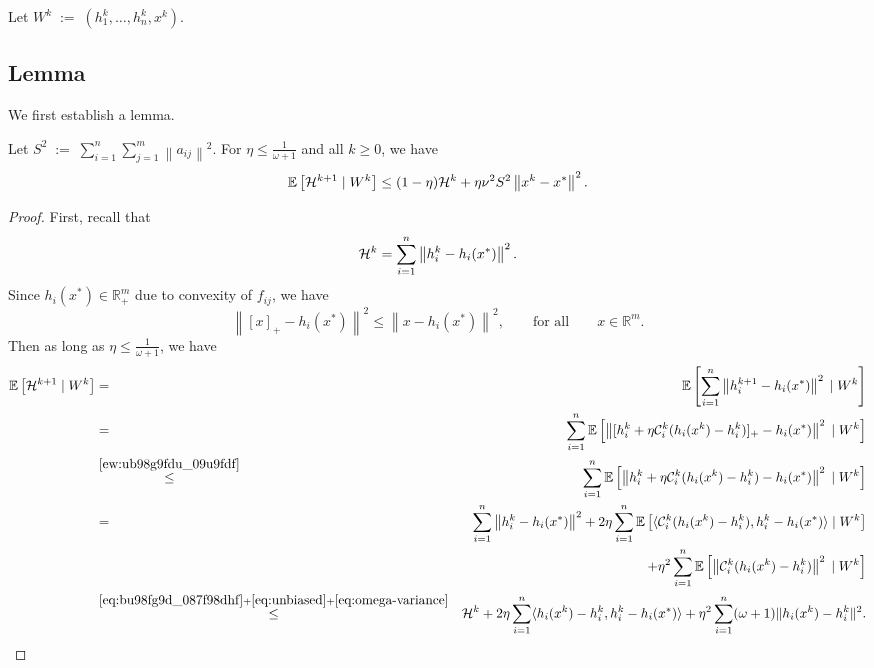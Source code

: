 \documentclass[12pt]{article}
\newcommand{\eqdef}{\; { := }\;}
\newcommand{\R}{\mathbb{R}}
\newcommand{\ExpBr}[1]{\mathbb{E}\left[#1\right]}
\newcommand{\norm}[1]{\left\|#1\right\|}
\newcommand{\cC}{{\mathcal{C}}}
\begin{document}
Let $W^k \eqdef (h_1^k, \dots, h_n^k, x^k)$.


\subsection{Lemma}

We first establish a lemma.

\begin{lemma}\label{lm:calHk} Let $S^2\eqdef \sum_{i=1}^n \sum_{j=1}^m \norm{a_{ij}}^2$. For $\eta \leq \frac{1}{\omega+1}$ and all $k\geq 0$, we have 
$$
\ExpBr{ {\cal H}^{k+1} \;|\; W^k} \leq  (1-\eta) {\cal H}^k +  \eta \nu^2 S^2 \norm{x^k - x^*}^2.
$$
\end{lemma}

\begin{proof}
First, recall that
\begin{equation}\label{eq:bu98fg9d_087f98dhf}{\cal H}^{k} =   \sum_{i=1}^n \norm{h_i^{k} - h_i(x^*)}^2 .\end{equation}Since $h_{i}(x^*) \in \R^m_+$ due to convexity of $f_{ij}$, we have \begin{equation} \label{ew:ub98g9fdu_09u9fdf}\norm{[x]_+ - h_i(x^*)}^2 \leq \norm{x - h_i(x^*)}^2, \qquad \text{for all} \qquad x \in \R^m.\end{equation} Then as long as $\eta \leq \frac{1}{\omega+1}$, we have 
\begin{eqnarray}
\ExpBr{{\cal H}^{k+1} \;|\; W^k}	&=& \ExpBr{  \sum_{i=1}^n \norm{h_i^{k+1} - h_i(x^*)}^2  \;|\; W^k} \notag \\ 
	&=&  \sum_{i=1}^n\ExpBr{  \norm{ [h^k_i + \eta \cC_i^k(h_i(x^k) - h^k_i)]_+ - h_i(x^*) }^2  \;|\; W^k} \notag  \\ 
	&\overset{\eqref{ew:ub98g9fdu_09u9fdf}}{\leq} &    \sum_{i=1}^n \ExpBr{\norm{ h^k_i + \eta \cC_i^k(h_i(x^k) - h^k_i) - h_i(x^*) }^2 \;|\; W^k }\notag  \\ 
	&=& \sum_{i=1}^n  \norm{ h_i^k - h_i(x^*) }^2   + 2 \eta\sum_{i=1}^n \ExpBr{  \langle  \cC_i^k(h_i(x^k) - h_i^k),  h_i^k - h_i(x^*) \rangle \;|\; W^k}\notag  \\
	&& \qquad + \eta^2 \sum_{i=1}^n \ExpBr{ \norm{\cC_i^k(h_i(x^k) - h_i^k) }^2 \;|\; W^k} \notag \\ 
	&\overset{\eqref{eq:bu98fg9d_087f98dhf}+\eqref{eq:unbiased} + \eqref{eq:omega-variance}}{\leq} &  {\cal H}^k  + 2\eta \sum_{i=1}^n    \langle  h_i(x^k) - h_i^k, h_i^k - h_i(x^*) \rangle  + \eta^2 \sum_{i=1}^n  (\omega+1) \|h_i(x^k) - h_i^k\|^2 .\label{eq:nbu98fd-09ud9f8hufd-fd}
	\end{eqnarray}
	

\end{proof}
\end{document}
